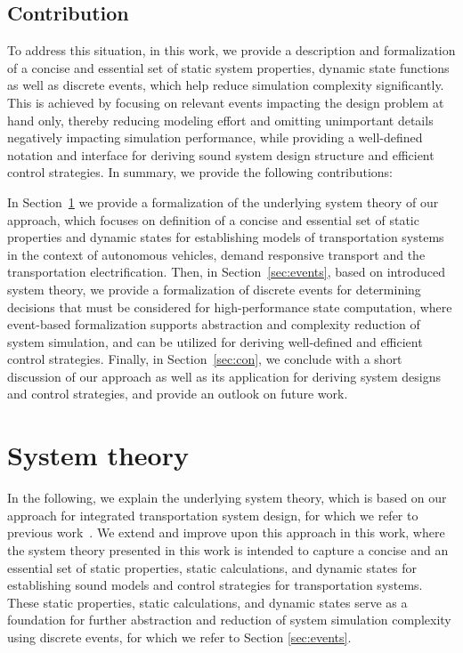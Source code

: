\documentclass[graybox]{svmult}
\begin{document}
\subsection{Contribution}

To address this situation, in this work, we provide a description and formalization of a concise and essential set of static system properties, dynamic state functions as well as discrete events, which help reduce simulation complexity significantly. 
This is achieved by focusing on relevant events impacting the design problem at hand only, thereby reducing modeling effort and omitting unimportant details negatively impacting simulation performance, while providing a well-defined notation and interface for deriving sound system design structure and efficient control strategies. In summary, we provide the following contributions:

In Section~\ref{sec:theory} we provide a formalization of the underlying system theory of our approach, which focuses on definition of a concise and essential set of static properties and dynamic states for establishing models of transportation systems in the context of autonomous vehicles, demand responsive transport and the transportation electrification.
Then, in Section~\ref{sec:events}, based on introduced system theory, we provide a formalization of discrete events for determining decisions that must be considered for high-performance state computation, where event-based formalization supports abstraction and complexity reduction of system simulation, and can be utilized for deriving well-defined and efficient control strategies. 
Finally, in Section~\ref{sec:con}, we conclude with a short discussion of our approach as well as its application for deriving system designs and control strategies, and provide an outlook on future work.

\section{System theory}
\label{sec:theory}

In the following, we explain the underlying system theory, which is based on our approach for integrated transportation system design, for which we refer to previous work~\cite{Ascher2014,Ascher2015,Ascher2016,Ascher2017}.
We extend and improve upon this approach in this work, where the system theory presented in this work is intended to capture a concise and an essential set of static properties, static calculations, and dynamic states for establishing sound models and control strategies for transportation systems.
These static properties, static calculations, and dynamic states serve as a foundation for further abstraction and reduction of system simulation complexity using discrete events, for which we refer to Section \ref{sec:events}.
\end{document}
